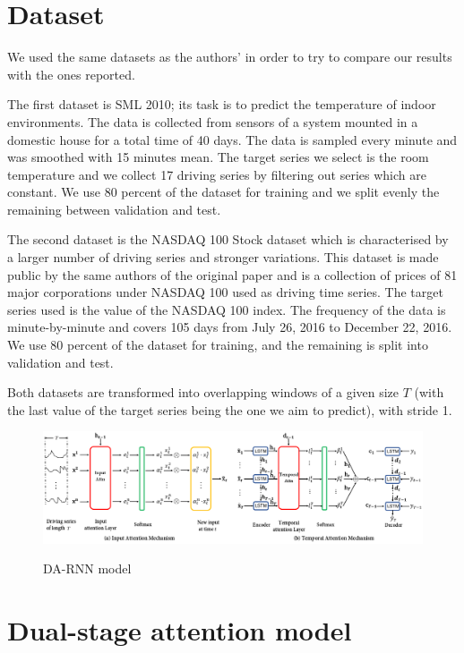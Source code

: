 \documentclass{article}
\begin{document}
\section{Dataset}
\label{sec:retrieval}

We used the same datasets as the authors' in order to try to compare our results
with the ones reported.

The first dataset is SML 2010; its task is to predict the temperature of indoor
environments. The data is collected from sensors of a system mounted in a
domestic house for a total time of 40 days. The data is sampled every minute
and
was smoothed with 15 minutes mean. The target series we select is the room
temperature and we collect 17 driving series by filtering out series which
are constant. We use $80$ percent of the dataset for training and we
split evenly the remaining between validation and test.

The second dataset is the NASDAQ 100 Stock dataset which is characterised by a
larger number of driving series and stronger variations. This dataset is
made public by the same
authors of the original paper and is a collection of prices of 81 major
corporations under NASDAQ 100 used as driving time series. The target series
used is the value of the NASDAQ 100 index. The frequency of the data is
minute-by-minute and covers 105 days from July 26, 2016 to December 22, 2016.
We use $80$ percent of the dataset for training, and the remaining is split
into
validation and test.

Both datasets are transformed into overlapping windows of a given size
$T$ (with the last value of the target series being the one we aim to predict),
with stride 1.

\begin{figure}[h]
\centering
\includegraphics[width=\linewidth]{da-rnn.png} \\
\caption{DA-RNN model}

\label{fig:da-rnn}
\end{figure}


\section{Dual-stage attention model}
\label{sec:da-rnn}
\end{document}
